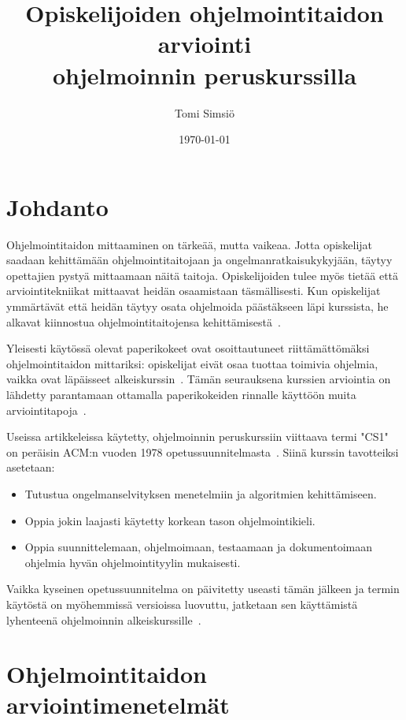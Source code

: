 \documentclass[finnish]{../tktltiki2}
\title{Opiskelijoiden ohjelmointitaidon arviointi \texorpdfstring{\\}{}ohjelmoinnin peruskurssilla}
\author{Tomi Simsiö}
\date{\today}
\theoremstyle{definition}
\theoremstyle{remark}
\begin{document}

\maketitle
\tableofcontents
\newpage



\section{Johdanto}

Ohjelmointitaidon mittaaminen on tärkeää, mutta vaikeaa. Jotta opiskelijat saadaan kehittämään ohjelmointitaitojaan ja ongelmanratkaisukykyjään, täytyy opettajien pystyä mittaamaan näitä taitoja. Opiskelijoiden tulee myös tietää että arviointitekniikat mittaavat heidän osaamistaan täsmällisesti. Kun opiskelijat ymmärtävät että heidän täytyy osata ohjelmoida päästäkseen läpi kurssista, he alkavat kiinnostua ohjelmointitaitojensa kehittämisestä~\cite{DW04}.

Yleisesti käytössä olevat paperikokeet ovat osoittautuneet riittämättö\-mäksi ohjelmointitaidon mittariksi: opiskelijat eivät osaa tuottaa toimivia ohjelmia, vaikka ovat läpäisseet alkeiskurssin~\cite{MAD01}. Tämän seurauksena kurssien arviointia on lähdetty parantamaan ottamalla paperikokeiden rinnalle käyttöön muita arviointitapoja~\cite{CJ01, CG02, WM03}.

Useissa artikkeleissa käytetty, ohjelmoinnin peruskurssiin viittaava termi "CS1" on peräisin ACM:n vuoden 1978 opetussuunnitelmasta~\cite{ACM78}. Siinä kurssin tavotteiksi asetetaan:
\begin{itemize}
  \item Tutustua ongelmanselvityksen menetelmiin ja algoritmien kehittämi\-seen.
  \item Oppia jokin laajasti käytetty korkean tason ohjelmointikieli.
  \item Oppia suunnittelemaan, ohjelmoimaan, testaamaan ja dokumentoimaan ohjelmia hyvän ohjelmointityylin mukaisesti.
\end{itemize}
Vaikka kyseinen opetussuunnitelma on päivitetty useasti tämän jälkeen ja termin käytöstä on myöhemmissä versioissa luovuttu, jatketaan sen käyttämistä lyhenteenä ohjelmoinnin alkeiskurssille~\cite{H10}.

\section{Ohjelmointitaidon arviointimenetelmät}
\end{document}
